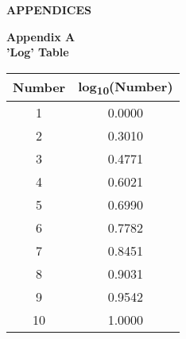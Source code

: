 \documentclass[12pt, english, onehalfspacing]{report}
\begin{document}
\pagestyle{plain}






\tableofcontents
\newpage
\listoffigures
\newpage
\listoftables
\newpage

\printnomenclature
\newpage

\setcounter{page}{1}







% 



\newpage
\begin{center}
\vspace*{5in}
 {\Large \textbf{APPENDICES}}  
\end{center}

\newpage
\begin{center}
 {\Large \textbf{Appendix A}} \\\vspace*{0.5 cm}
 {\Large \textbf{'Log' Table}}
\end{center}
 \begin{center}
\begin{tabular}{|c|c|}
\hline
\textbf{Number} & \textbf{log\textsubscript{10}(Number)} \\
\hline
1 & 0.0000 \\
2 & 0.3010 \\
3 & 0.4771 \\
4 & 0.6021 \\
5 & 0.6990 \\
6 & 0.7782 \\
7 & 0.8451 \\
8 & 0.9031 \\
9 & 0.9542 \\
10 & 1.0000 \\
\hline
\end{tabular}
\end{center}
\end{document}
